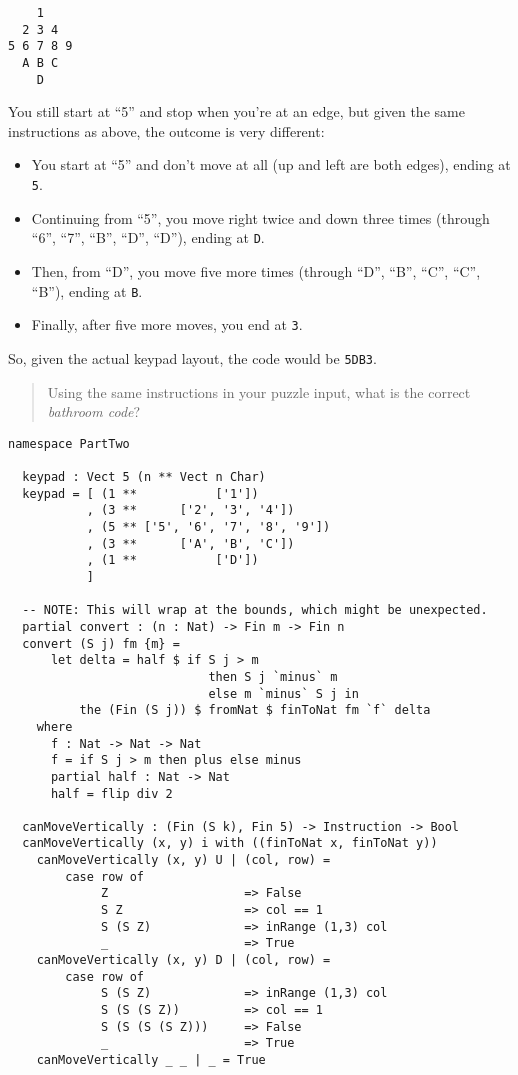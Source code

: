 \begin{verbatim}
    1
  2 3 4
5 6 7 8 9
  A B C
    D
\end{verbatim}

You still start at ``5'' and stop when you're at an edge, but given the
same instructions as above, the outcome is very different:

\begin{itemize}
\tightlist
\item
  You start at ``5'' and don't move at all (up and left are both edges),
  ending at \texttt{5}.
\item
  Continuing from ``5'', you move right twice and down three times
  (through ``6'', ``7'', ``B'', ``D'', ``D''), ending at
  \texttt{D}.
\item
  Then, from ``D'', you move five more times (through ``D'', ``B'',
  ``C'', ``C'', ``B''), ending at \texttt{B}.
\item
  Finally, after five more moves, you end at \texttt{3}.
\end{itemize}

\newpage

So, given the actual keypad layout, the code would be
\texttt{5DB3}.

\begin{quote}
  Using the same instructions in your puzzle input, what is the correct
  \textit{bathroom code}?
\end{quote}

\begin{verbatim}
namespace PartTwo

  keypad : Vect 5 (n ** Vect n Char)
  keypad = [ (1 **           ['1'])
           , (3 **      ['2', '3', '4'])
           , (5 ** ['5', '6', '7', '8', '9'])
           , (3 **      ['A', 'B', 'C'])
           , (1 **           ['D'])
           ]

  -- NOTE: This will wrap at the bounds, which might be unexpected.
  partial convert : (n : Nat) -> Fin m -> Fin n
  convert (S j) fm {m} =
      let delta = half $ if S j > m
                            then S j `minus` m
                            else m `minus` S j in
          the (Fin (S j)) $ fromNat $ finToNat fm `f` delta
    where
      f : Nat -> Nat -> Nat
      f = if S j > m then plus else minus
      partial half : Nat -> Nat
      half = flip div 2

  canMoveVertically : (Fin (S k), Fin 5) -> Instruction -> Bool
  canMoveVertically (x, y) i with ((finToNat x, finToNat y))
    canMoveVertically (x, y) U | (col, row) =
        case row of
             Z                   => False
             S Z                 => col == 1
             S (S Z)             => inRange (1,3) col
             _                   => True
    canMoveVertically (x, y) D | (col, row) =
        case row of
             S (S Z)             => inRange (1,3) col
             S (S (S Z))         => col == 1
             S (S (S (S Z)))     => False
             _                   => True
    canMoveVertically _ _ | _ = True
\end{verbatim}

